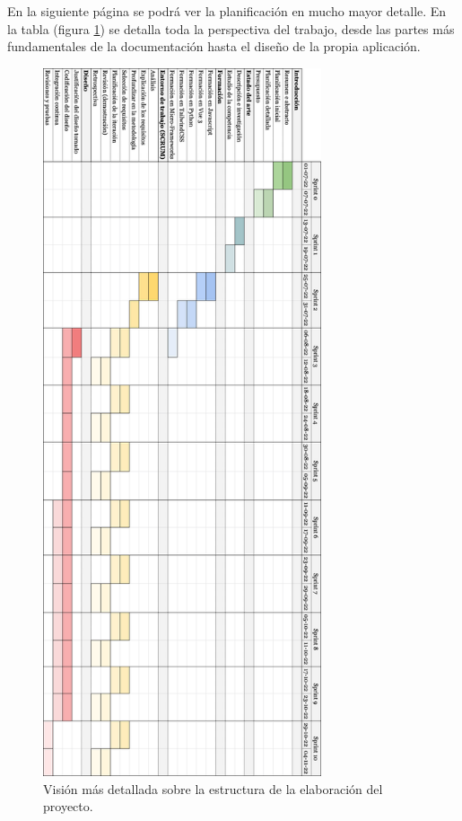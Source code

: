 En la siguiente página se podrá ver la planificación en mucho mayor detalle. En la tabla (figura \ref{gfx:plan-detallado}) se detalla toda la perspectiva del trabajo, desde las partes más fundamentales de la documentación hasta el diseño de la propia aplicación.

\begin{figure}[hbtp]

    \myfloatalign
    \includegraphics[width=0.73\textwidth]{gfx/plan-detallado.png}
    \caption[Planificación detallada del proyecto]{Visión más detallada sobre la estructura de la elaboración del proyecto.}\label{gfx:plan-detallado}

\end{figure}

